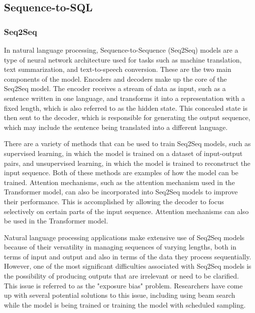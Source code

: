 \subsection{Sequence-to-SQL}

\subsubsection{Seq2Seq}

In natural language processing, Sequence-to-Sequence (Seq2Seq)\cite{DBLP:journals/corr/SutskeverVL14} models are a type of neural network architecture used for tasks such as machine translation, text summarization, and text-to-speech conversion. These are the two main components of the model. Encoders and decoders make up the core of the Seq2Seq model. The encoder receives a stream of data as input, such as a sentence written in one language, and transforms it into a representation with a fixed length, which is also referred to as the hidden state. This concealed state is then sent to the decoder, which is responsible for generating the output sequence, which may include the sentence being translated into a different language.

There are a variety of methods that can be used to train Seq2Seq models, such as supervised learning, in which the model is trained on a dataset of input-output pairs, and unsupervised learning, in which the model is trained to reconstruct the input sequence. Both of these methods are examples of how the model can be trained. Attention mechanisms, such as the attention mechanism used in the Transformer model, can also be incorporated into Seq2Seq models to improve their performance. This is accomplished by allowing the decoder to focus selectively on certain parts of the input sequence. Attention mechanisms can also be used in the Transformer model.

Natural language processing applications make extensive use of Seq2Seq models because of their versatility in managing sequences of varying lengths, both in terms of input and output and also in terms of the data they process sequentially. However, one of the most significant difficulties associated with Seq2Seq models is the possibility of producing outputs that are irrelevant or need to be clarified. This issue is referred to as the "exposure bias" problem. Researchers have come up with several potential solutions to this issue, including using beam search while the model is being trained or training the model with scheduled sampling.


